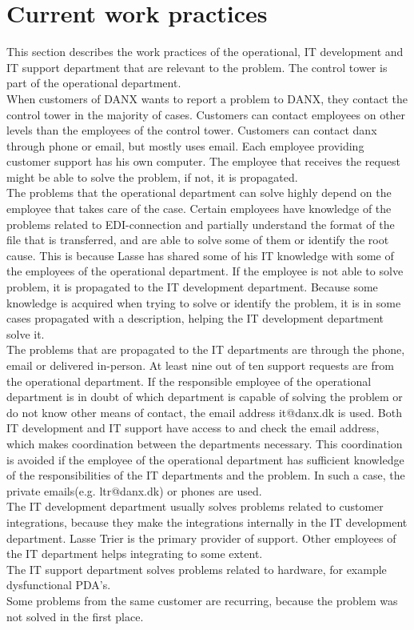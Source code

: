 \section{Current work practices}
\label{sec:workpractices}
This section describes the work practices of the operational, IT development and IT support department that are relevant to the problem. The control tower is part of the operational department.\\
When customers of DANX wants to report a problem to DANX, they contact the control tower in the majority of cases.\cite{gert004} Customers can contact employees on other levels than the employees of the control tower.\cite{gert007} Customers can contact danx through phone or email, but mostly uses email.\cite{gert020} Each employee providing customer support has his own computer.\cite{gert024} The employee that receives the request might be able to solve the problem, if not, it is propagated.\\
The problems that the operational department can solve highly depend on the employee that takes care of the case.\cite{lasse002} Certain employees have knowledge of the problems related to EDI-connection and partially understand the format of the file that is transferred, and are able to solve some of them or identify the root cause. This is because Lasse has shared some of his IT knowledge with some of the employees of the operational department.\cite{lasse006} If the employee is not able to solve problem, it is propagated to the IT development department. Because some knowledge is acquired when trying to solve or identify the problem, it is in some cases propagated with a description, helping the IT development department solve it.\cite{gert006}\cite{lasse005}\\
The problems that are propagated to the IT departments are through the phone, email or delivered in-person.\cite{gert019} At least nine out of ten support requests are from the operational department.\cite{lasse001} If the responsible employee of the operational department is in doubt of which department is capable of solving the problem or do not know other means of contact, the email address it@danx.dk is used\cite{lasse003}. Both IT development and IT support have access to and check the email address, which makes coordination between the departments necessary.\cite{lasse004} This coordination is avoided if the employee of the operational department has sufficient knowledge of the responsibilities of the IT departments and the problem. In such a case, the private emails(e.g. ltr@danx.dk) or phones are used.\\
The IT development department usually solves problems related to customer integrations, because they make the integrations internally in the IT development department. Lasse Trier is the primary provider of support.\cite{lahib004} Other employees of the IT department helps integrating to some extent.\cite{lahib002}\cite{lahib003}\\
The IT support department solves problems related to hardware, for example dysfunctional PDA’s.\cite{lasse003}\\
Some problems from the same customer are recurring, because the problem was not solved in the first place.\cite{gert009}

